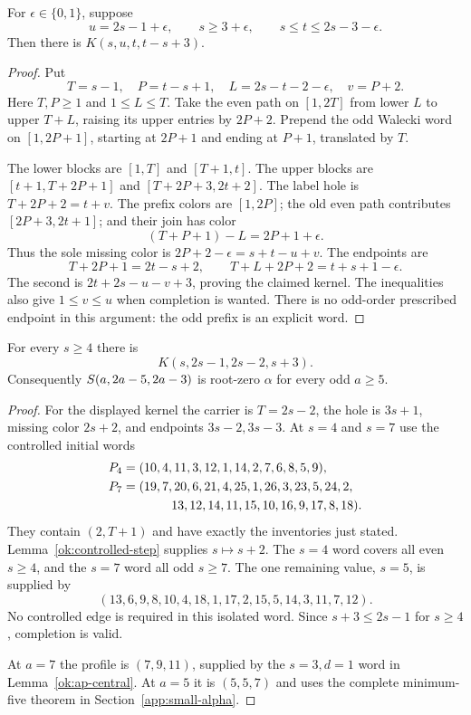 \begin{lemma}\label{ok:odd-prefix-boundaries}
For $\epsilon\in\{0,1\}$, suppose
\[
 u=2s-1+\epsilon,\qquad
 s\ge3+\epsilon,\qquad s\le t\le2s-3-\epsilon.
 \]
Then there is $K(s,u,t,t-s+3)$.
\end{lemma}
\begin{proof}
Put
\[
 T=s-1,\quad P=t-s+1,\quad L=2s-t-2-\epsilon,\quad v=P+2.
 \]
Here $T,P\ge1$ and $1\le L\le T$.
Take the even path on $[1,2T]$ from lower $L$ to upper $T+L$,
raising its upper entries by $2P+2$. Prepend the odd Walecki
word on $[1,2P+1]$, starting at $2P+1$ and ending at $P+1$,
translated by $T$.

The lower blocks are $[1,T]$ and $[T+1,t]$. The upper blocks
are $[t+1,T+2P+1]$ and $[T+2P+3,2t+2]$.
The label hole is $T+2P+2=t+v$.
The prefix colors are $[1,2P]$; the old even path contributes
$[2P+3,2t+1]$; and their join has color
\[
 (T+P+1)-L=2P+1+\epsilon.
 \]
Thus the sole missing color is $2P+2-\epsilon=s+t-u+v$.
The endpoints are
\[
 T+2P+1=2t-s+2,\qquad
 T+L+2P+2=t+s+1-\epsilon.
 \]
The second is $2t+2s-u-v+3$, proving the claimed kernel.
The inequalities also give $1\le v\le u$ when completion is wanted.
There is no odd-order prescribed endpoint in this argument: the odd
prefix is an explicit word.
\end{proof}

\begin{lemma}\label{ok:gap-two-kernels}
For every $s\ge4$ there is
\[
 K(s,2s-1,2s-2,s+3).
 \]
Consequently $S\!\left(a,2a-5,2a-3\right)$ is root-zero $\alpha$ for
every odd $a\ge5$.
\end{lemma}
\begin{proof}
For the displayed kernel the carrier is $T=2s-2$, the hole is
$3s+1$, missing color $2s+2$, and endpoints $3s-2,3s-3$.
At $s=4$ and $s=7$ use the controlled initial words
\begin{align*}
 P_4={}&(10,4,11,3,12,1,14,2,7,6,8,5,9),\\
 P_7={}&(19,7,20,6,21,4,25,1,26,3,23,5,24,2,\\
       &\hspace{9mm}13,12,14,11,15,10,16,9,17,8,18).
\end{align*}
They contain $(2,T+1)$ and have exactly the inventories just stated.
Lemma~\ref{ok:controlled-step} supplies $s\mapsto s+2$.
The $s=4$ word covers all even $s\ge4$, and the $s=7$ word
all odd $s\ge7$. The one remaining value, $s=5$, is supplied by
\[
 (13,6,9,8,10,4,18,1,17,2,15,5,14,3,11,7,12).
 \]
No controlled edge is required in this isolated word.
Since $s+3\le2s-1$ for $s\ge4$, completion is valid.

At $a=7$ the profile is $(7,9,11)$, supplied by the
$s=3,d=1$ word in Lemma~\ref{ok:ap-central}.
At $a=5$ it is $(5,5,7)$ and uses the complete
minimum-five theorem in Section~\ref{app:small-alpha}.
\end{proof}

